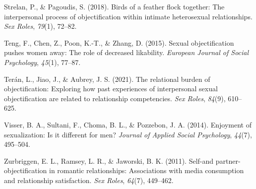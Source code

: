 \documentclass[
  man]{apa6}
\newlength{\cslhangindent}
\newlength{\cslentryspacingunit} %
\newenvironment{CSLReferences}[2] %
 {%
  \setlength{\parindent}{0pt}
  \ifodd #1
  \let\oldpar\par
  \def\par{\hangindent=\cslhangindent\oldpar}
  \fi
  \setlength{\parskip}{#2\cslentryspacingunit}
 }%
 {}
\begin{document}
\begin{CSLReferences}{1}{0}
\leavevmode{}%
Strelan, P., \& Pagoudis, S. (2018). Birds of a feather flock together: The interpersonal process of objectification within intimate heterosexual relationships. \emph{Sex Roles}, \emph{79}(1), 72--82.

\leavevmode{}%
Teng, F., Chen, Z., Poon, K.-T., \& Zhang, D. (2015). Sexual objectification pushes women away: The role of decreased likability. \emph{European Journal of Social Psychology}, \emph{45}(1), 77--87.

\leavevmode{}%
Terán, L., Jiao, J., \& Aubrey, J. S. (2021). The relational burden of objectification: Exploring how past experiences of interpersonal sexual objectification are related to relationship competencies. \emph{Sex Roles}, \emph{84}(9), 610--625.

\leavevmode{}%
Visser, B. A., Sultani, F., Choma, B. L., \& Pozzebon, J. A. (2014). Enjoyment of sexualization: Is it different for men? \emph{Journal of Applied Social Psychology}, \emph{44}(7), 495--504.

\leavevmode{}%
Zurbriggen, E. L., Ramsey, L. R., \& Jaworski, B. K. (2011). Self-and partner-objectification in romantic relationships: Associations with media consumption and relationship satisfaction. \emph{Sex Roles}, \emph{64}(7), 449--462.

\end{CSLReferences}

\endgroup
\end{document}
